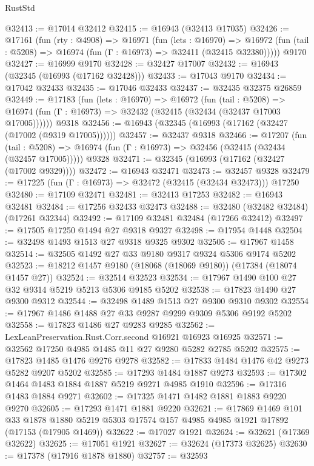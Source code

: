 \begin{lexlean}{RustStd}
\begin{coremodule}
@32413 := @17014 @32412
@32415 := @16943 (@32413 @17035)
@32426 := @17161
    (fun (rty : @4908) =>
    @16971
      (fun (lets : @16970) =>
      @16972 (fun (tail : @5208) => @16974 (fun (Γ : @16973) => @32411 (@32415 @32380)))))
    @9170
@32427 := @16999 @9170
@32428 := @32427 @17007
@32432 := @16943 (@32345 (@16993 (@17162 @32428)))
@32433 := @17043 @9170
@32434 := @17042 @32433
@32435 := @17046 @32433
@32437 := @32435 @32375 @26859
@32449 := @17183
    (fun (lets : @16970) =>
    @16972
      (fun (tail : @5208) =>
      @16974 (fun (Γ : @16973) => @32432 (@32415 (@32434 (@32437 @17003 @17005))))))
    @9318
@32456 := @16943 (@32345 (@16993 (@17162 (@32427 (@17002 (@9319 @17005))))))
@32457 := @32437 @9318
@32466 := @17207
    (fun (tail : @5208) => @16974 (fun (Γ : @16973) => @32456 (@32415 (@32434 (@32457 @17005)))))
    @9328
@32471 := @32345 (@16993 (@17162 (@32427 (@17002 @9329))))
@32472 := @16943 @32471
@32473 := @32457 @9328
@32479 := @17225 (fun (Γ : @16973) => @32472 (@32415 (@32434 @32473))) @17250
@32480 := @17109 @32471
@32481 := @32413 @17253
@32482 := @16943 @32481
@32484 := @17256 @32433 @32473
@32488 := @32480 (@32482 @32484) (@17261 @32344)
@32492 := @17109 @32481 @32484 (@17266 @32412)
@32497 := @17505 @17250 @1494 @27 @9318 @9327
@32498 := @17954 @1448
@32504 := @32498 @1493 @1513 @27 @9318 @9325 @9302
@32505 := @17967 @1458
@32514 := @32505 @1492 @27 @33 @9180 @9317 @9324 @5306 @9174 @5202
@32523 := @18212 @1457 @9180 (@18068 (@18069 @9180)) (@17384 (@18074 @1457 @27))
@32524 := @32514 @32523
@32534 := @17967 @1490 @100 @27 @32 @9314 @5219 @5213 @5306 @9185 @5202
@32538 := @17823 @1490 @27 @9300 @9312
@32544 := @32498 @1489 @1513 @27 @9300 @9310 @9302
@32554 := @17967 @1486 @1488 @27 @33 @9287 @9299 @9309 @5306 @9192 @5202
@32558 := @17823 @1486 @27 @9283 @9285
@32562 := LexLeanPreservation.Rust.Corr.second @16921 @16923 @16925
@32571 := @32562 @17250 @4985 @1485 @11 @27 @9280 @5282 @2785 @5202
@32575 := @17823 @1485 @1476 @9276 @9278
@32582 := @17833 @1484 @1476 @42 @9273 @5282 @9207 @5202
@32585 := @17293 @1484 @1887 @9273
@32593 := @17302 @1464 @1483 @1884 @1887 @5219 @9271 @4985 @1910
@32596 := @17316 @1483 @1884 @9271
@32602 := @17325 @1471 @1482 @1881 @1883 @9220 @9270
@32605 := @17293 @1471 @1881 @9220
@32621 := @17869
    @1469
    @101
    @33
    @1878
    @1880
    @5219
    @5303
    @17574
    @157
    @4985
    @4985
    @1921
    @17892
    (@17153 (@17905 @1469))
@32622 := @17027 @1921
@32624 := @32621 (@17369 @32622)
@32625 := @17051 @1921
@32627 := @32624 (@17373 @32625)
@32630 := @17378 (@17916 @1878 @1880)
@32757 := @32593

\end{coremodule}
\end{lexlean}
